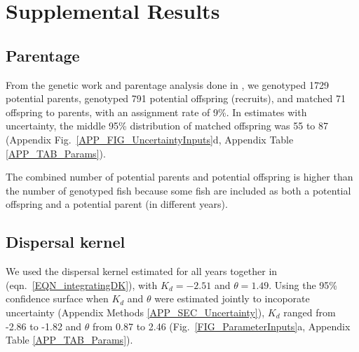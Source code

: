 \documentclass[12pt, oneside]{article}   	%
\begin{document}


\newpage{}

\section{Supplemental Results} \label{APP_SEC_RESULTS} %

\subsection{Parentage} \label{APP_SEC_RESULTS_Parentage}

From the genetic work and parentage analysis done in \cite{catalanoInPrepconnectivity}, we genotyped 1729 potential parents, genotyped 791 potential offspring (recruits), and matched 71 offspring to parents, with an assignment rate of 9\%. In estimates with uncertainty, the middle 95\% distribution of matched offspring was 55 to 87 (Appendix Fig.\ \ref{APP_FIG_UncertaintyInputs}d, Appendix Table \ref{APP_TAB_Params}).

The combined number of potential parents and potential offspring is higher than the number of genotyped fish because some fish are included as both a potential offspring and a potential parent (in different years).

\subsection{Dispersal kernel} \label{APP_SEC_RESULTS_Dispersal}

We used the dispersal kernel estimated for all years together in \cite{catalanoInPrepconnectivity} (eqn.\ \ref{EQN_integratingDK}), with $K_d = -2.51$ and $\theta = 1.49$. Using the 95\% confidence surface when $K_d$ and $\theta$ were estimated jointly to incoporate uncertainty (Appendix Methods \ref{APP_SEC_Uncertainty}), $K_d$ ranged from -2.86 to -1.82 and $\theta$ from 0.87 to 2.46 (Fig.\ \ref{FIG_ParameterInputs}a, Appendix Table \ref{APP_TAB_Params}).
\end{document}
